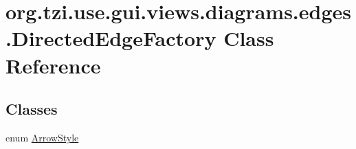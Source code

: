 \hypertarget{classorg_1_1tzi_1_1use_1_1gui_1_1views_1_1diagrams_1_1edges_1_1_directed_edge_factory}{\section{org.\-tzi.\-use.\-gui.\-views.\-diagrams.\-edges.\-Directed\-Edge\-Factory Class Reference}
\label{classorg_1_1tzi_1_1use_1_1gui_1_1views_1_1diagrams_1_1edges_1_1_directed_edge_factory}
}
\subsection*{Classes}
\begin{DoxyCompactItemize}
\item 
enum \hyperlink{enumorg_1_1tzi_1_1use_1_1gui_1_1views_1_1diagrams_1_1edges_1_1_directed_edge_factory_1_1_arrow_style}{Arrow\-Style}
\end{DoxyCompactItemize}
